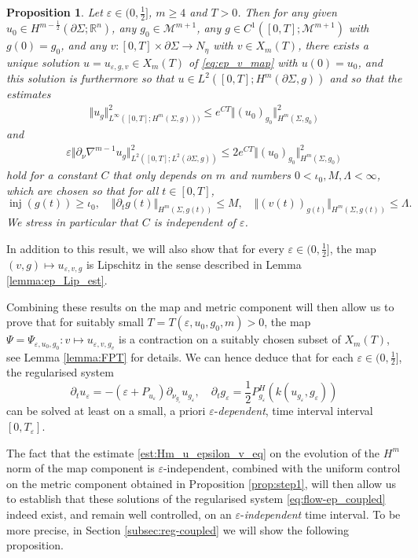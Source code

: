 \documentclass[10pt,reqno]{amsart}
\theoremstyle{plain}
\newtheorem{prop}[lemma]{Proposition}
\theoremstyle{definition}
\numberwithin{equation}{section}
\newcommand{\La}{\Lambda}
\newcommand{\Si}{\Sigma}
\newcommand{\ep}{\varepsilon}
\newcommand{\R}{\ensuremath{{\mathbb R}}}
\DeclareMathOperator{\inj}{inj}
\newcommand{\norm}[1]{\Vert#1\Vert}
\newcommand{\beq}{\begin{equation}}
\newcommand{\eeq}{\end{equation}}
\newcommand{\beqa}{\begin{equation}\begin{aligned}}
\newcommand{\eeqa}{\end{aligned}\end{equation}}
\newcommand{\half}{\frac{1}{2}}
\newcommand{\pt}{\partial_t}
\newcommand{\eps}{\varepsilon}
\newcommand{\pSi}{{\partial \Sigma}}
\newcommand{\MM}{\mathcal{M}} %
\newcommand{\hf}{\frac{1}{2}} %
\newcommand{\p}{\partial} %
\begin{document}
\begin{prop}\label{prop:ep_map_solve}
    Let $\ep\in (0,\hf]$, $m\ge 4$ and $T>0$. Then for any given $u_0\in H^{m-\hf}(\p\Si;\R^n)$, any $g_0\in\MM^{m+1}$, any $g\in C^1([0,T];\MM^{m+1})$ with $g(0)=g_0$, and any $v:[0,T]\times\p\Si\rightarrow N_\eta$ with $v\in X_m(T)$, there exists a unique solution $u=u_{\ep,g,v}\in X_m(T)$ of \eqref{eq:ep_v_map} with $u(0) = u_0$, and this solution is furthermore so that $u\in L^2([0,T];H^{m}(\pSi,g))$ 
    and so that the estimates
    \beqa\label{est:Hm_u_epsilon_v_eq}
        \norm{u_{g}}_{L^\infty([0,T];H^m(\Si,g)))}^2 \leq e^{CT}\norm{(u_0)_{g_0}}_{H^m(\Si,g_0)}^2
    \eeqa
    and 
    \beqa\label{est:Hm_u_epsilon_v_eq-extra}
        \eps \norm{\p_\nu \nabla^{m-1} u_g}_{L^2([0,T];L^2(\p\Si,g))}^2 \leq 2 e^{CT}\norm{(u_0)_{g_0}}_{H^m(\Si,g_0)}^2
    \eeqa
    hold for a constant $C$ that only depends on $m$ and numbers $0 < \iota_0, M, \La < \infty$, which are chosen so that for all $t\in [0,T]$,
    \beq\label{ass:const_lemma_eps} 
        \inj(g(t))\geq \iota_0,\quad \norm{\pt g(t)}_{H^{m}(\Si,g(t))}\leq M,\quad \norm{(v(t))_{g(t)}}_{H^m(\Si,g(t))}\leq \La.
    \eeq
    We stress in particular that $C$ is \emph{independent} of $\eps$. 
\end{prop}


In addition to this result, we will also show that for every $\eps\in (0,\half]$, the map $(v,g)\mapsto u_{\ep,v,g}$ is Lipschitz in the sense described in Lemma \ref{lemma:ep_Lip_est}. 

Combining these results on the map and metric component will then allow us to prove that for suitably small $T=T(\eps,u_0,g_0,m)>0$, the map
$
    \Psi=\Psi_{\ep,u_0,g_0}: v\mapsto u_{\ep,v,g_v}
$ 
is a contraction on a suitably chosen subset of $X_m(T)$, see Lemma \ref{lemma:FPT} for details. We can hence deduce that for each $\eps\in (0,\half]$, the regularised system 
\begin{equation}\label{eq:flow-ep_coupled} 
	\p_t u_\eps = -(\ep + P_{u_\eps})\p_{\nu_{g_\eps}}u_{g_\eps}, \quad \p_t g_\eps = \hf P_{g_\eps}^H(k(u_{g_\eps},g_\eps))
\end{equation}
can be solved at least on a small, a priori $\eps$-\textit{dependent}, time interval interval $[0,T_\eps]$. 

The fact that the estimate \eqref{est:Hm_u_epsilon_v_eq} on the evolution of the $H^m$ norm of the map component is $\eps$-independent, combined with the uniform control on the metric component obtained in Proposition \ref{prop:step1}, will then allow us to establish that these solutions of the regularised system \eqref{eq:flow-ep_coupled} indeed exist, and remain well controlled, on an $\eps$-\textit{independent} time interval. To be more precise, in Section \ref{subsec:reg-coupled} we will show the following proposition. 
\end{document}

